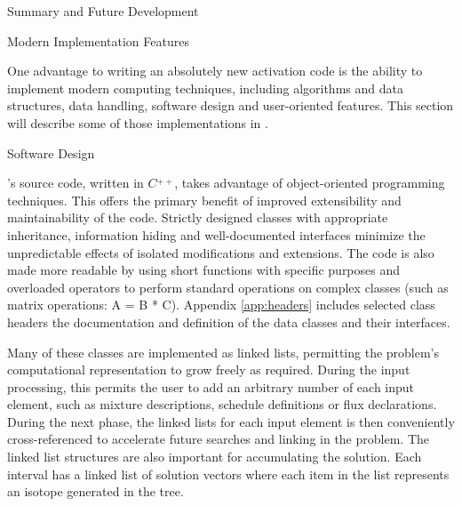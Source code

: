 
\begin{chapter}{Summary and Future Development}
  
  \begin{section}{Modern Implementation Features\label{sec:summary.modern}}
    
    One advantage to writing an absolutely new activation code is the
    ability to implement modern computing techniques, including
    algorithms and data structures, data handling, software design and
    user-oriented features.  This section will describe some of those
    implementations in \ALARA.

    \begin{subsection}{Software Design}
      
      \ALARA's source code, written in $C\!\!\!\stackrel{+\!\!+}{}$,
      takes advantage of object-oriented programming techniques.  This
      offers the primary benefit of improved extensibility and
      maintainability of the code.  Strictly designed classes with
      appropriate inheritance, information hiding and well-documented
      interfaces minimize the unpredictable effects of isolated
      modifications and extensions.  The code is also made more
      readable by using short functions with specific purposes and
      overloaded operators to perform standard operations on complex
      classes (such as matrix operations: A = B * C).  Appendix
      \ref{app:headers} includes selected class headers the
      documentation and definition of the data classes and their
      interfaces.
      
      Many of these classes are implemented as linked lists,
      permitting the problem's computational representation to grow
      freely as required.  During the input processing, this permits
      the user to add an arbitrary number of each input element, such
      as mixture descriptions, schedule definitions or flux
      declarations.  During the next phase, the linked lists for each
      input element is then conveniently cross-referenced to
      accelerate future searches and linking in the problem.  The
      linked list structures are also important for accumulating the
      solution.  Each interval has a linked list of solution vectors
      where each item in the list represents an isotope generated in
      the tree.
    \end{subsection}


\end{section}
\end{chapter}
